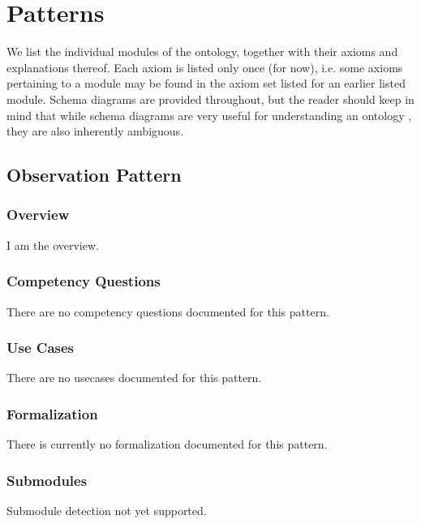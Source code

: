 \chapter{Patterns}
\label{sec:mods}
We list the individual modules of the ontology, together with their axioms and explanations thereof. Each axiom is listed only once (for now), i.e. some axioms pertaining to a module may be found in the axiom set listed for an earlier listed module. Schema diagrams are provided throughout, but the reader should keep in mind that while schema diagrams are very useful for understanding an ontology \cite{odp-documentation}, they are also inherently ambiguous.

\section{Observation Pattern}
\label{sec:observation-pattern}
\subsection{Overview}
\label{ssec:overview}
I am the overview.

\subsection{Competency Questions}
\label{ssec:cqs}
There are no competency questions documented for this pattern.

\subsection{Use Cases}
\label{ssec:use-cases}
There are no usecases documented for this pattern.
\subsection{Formalization}
\label{ssec:formalization}
There is currently no formalization documented for this pattern.

\subsection{Submodules}
\label{ssec:submodules}
Submodule detection not yet supported.

